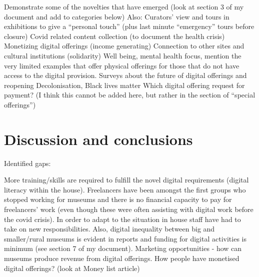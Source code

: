 \documentclass{egpubl}
\begin{document}









Demonstrate some of the novelties that have emerged (look at section 3 of my document and add to categories below)
Also: 
Curators’ view and tours in exhibitions to give a “personal touch” (plus last minute “emergency” tours before closure)
Covid related content collection (to document the health crisis)
Monetizing digital offerings (income generating)
Connection to other sites and cultural institutions (solidarity)
Well being, mental health focus, mention the very limited examples that offer physical offerings for those  that do not have access to the digital provision.
Surveys about the future of digital offerings and reopening
Decolonisation, Black lives matter
Which digital offering request for payment? (I think this cannot be added here, but rather in the section of “special offerings”)

\section{Discussion and conclusions}
\label{disc}
Identified gaps:

More training/skills are required to fulfill the novel digital requirements (digital literacy within the house). Freelancers have been amongst the first groups who stopped working for museums and there is no financial capacity to pay for freelancers' work (even though these were often assisting with digital work before the covid crisis). In order to adapt to the situation in house staff have had to take on new responsibilities. Also, digital inequality between big and smaller/rural museums is evident in reports and funding for digital activities is minimum (see section 7 of my document).
Marketing opportunities  - how can museums produce revenue from digital offerings. How people have monetised digital offerings? (look at Money list article)
\end{document}
